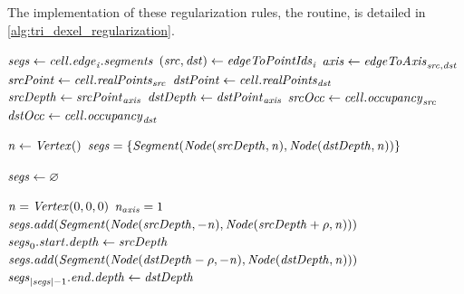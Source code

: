 The implementation of these regularization rules, \ie the  routine, is detailed in \cref{alg:tri_dexel_regularization}.
%
\begin{algorithm}
	\centering
	\begin{algorithmic}[1]
				\State $\mathit{segs} \gets \mathit{cell}.\mathit{edge}_{\mathit{i}}.\mathit{segments}$ 
				\label{line:reg_vars_begin}
				\State $(\mathit{src}, \mathit{dst}) \gets \mathit{edgeToPointIds}_{\mathit{i}}$
				\State $\mathit{axis} \gets \mathit{edgeToAxis}_{\mathit{src}, \mathit{dst}}$
				\State $\mathit{srcPoint} \gets \mathit{cell}.\mathit{realPoints}_{\mathit{src}}$
				\State $\mathit{dstPoint} \gets \mathit{cell}.\mathit{realPoints}_{\mathit{dst}}$
				\State $\mathit{srcDepth} \gets \mathit{srcPoint}_{\mathit{axis}}$
				\State $\mathit{dstDepth} \gets \mathit{dstPoint}_{\mathit{axis}}$
				\State $\mathit{srcOcc} \gets \mathit{cell}.\mathit{occupancy}_{\mathit{src}}$
				\State $\mathit{dstOcc} \gets \mathit{cell}.\mathit{occupancy}_{\mathit{dst}}$
				\label{line:reg_vars_end}

					\State $\mathit{n} \gets \mathit{Vertex}()$ 
					\State $\mathit{segs} = \{ \mathit{Segment}(\mathit{Node}(\mathit{srcDepth}, \mathit{n}), \mathit{Node}(\mathit{dstDepth}, \mathit{n})) \}$
				\EndIf

					\State $\mathit{segs} \gets \varnothing$
				\EndIf

				\State $\mathit{n} = \mathit{Vertex}(0, 0, 0)$
				\State $\mathit{n}_{\mathit{axis}} = 1$
						\State $\mathit{segs}.\mathit{add}(\mathit{Segment}(\mathit{Node}(\mathit{srcDepth}, -\mathit{n}), \mathit{Node}(\mathit{srcDepth} + \rho, \mathit{n})))$
						\State $\mathit{segs}_0.\mathit{start}.\mathit{depth} \gets \mathit{srcDepth}$
					\EndIf
				\EndIf
						\State $\mathit{segs}.\mathit{add}(\mathit{Segment}(\mathit{Node}(\mathit{dstDepth} - \rho, -\mathit{n}), \mathit{Node}(\mathit{dstDepth}, \mathit{n})))$
						\State $\mathit{segs}_{|\mathit{segs}| - 1}.\mathit{end}.\mathit{depth} \gets \mathit{dstDepth}$
					\EndIf
				\EndIf


\end{algorithmic}
\end{algorithm}

